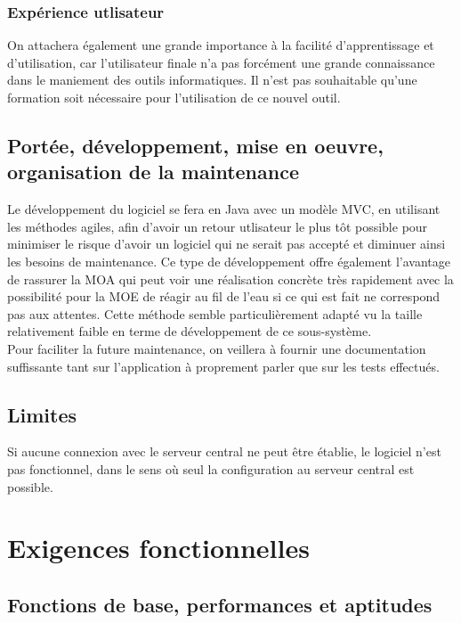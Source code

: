 \subsubsection{Expérience utlisateur}

On attachera également une grande importance à la facilité d'apprentissage et d'utilisation, car l'utilisateur finale n'a pas forcément une grande connaissance dans le maniement des outils informatiques. Il n'est pas souhaitable qu'une formation soit nécessaire pour l'utilisation de ce nouvel outil.

\subsection{Portée, développement, mise en oeuvre, organisation de la maintenance}

Le développement du logiciel se fera en Java avec un modèle MVC, en utilisant les méthodes agiles, afin d'avoir un retour utlisateur le plus tôt possible pour minimiser le risque d'avoir un logiciel qui ne serait pas accepté et diminuer ainsi les besoins de maintenance. Ce type de développement offre également l'avantage de rassurer la MOA qui peut voir une réalisation concrète très rapidement avec la possibilité pour la MOE de réagir au fil de l'eau si ce qui est fait ne correspond pas aux attentes. Cette méthode semble particulièrement adapté vu la taille relativement faible en terme de développement de ce sous-système.\\

Pour faciliter la future maintenance, on veillera à fournir une documentation suffissante tant sur l'application à proprement parler que sur les tests effectués.

\subsection{Limites}

Si aucune connexion avec le serveur central ne peut être établie, le logiciel n'est pas fonctionnel, dans le sens où seul la configuration au serveur central est possible.

\section{Exigences fonctionnelles}

\subsection{Fonctions de base, performances et aptitudes}

